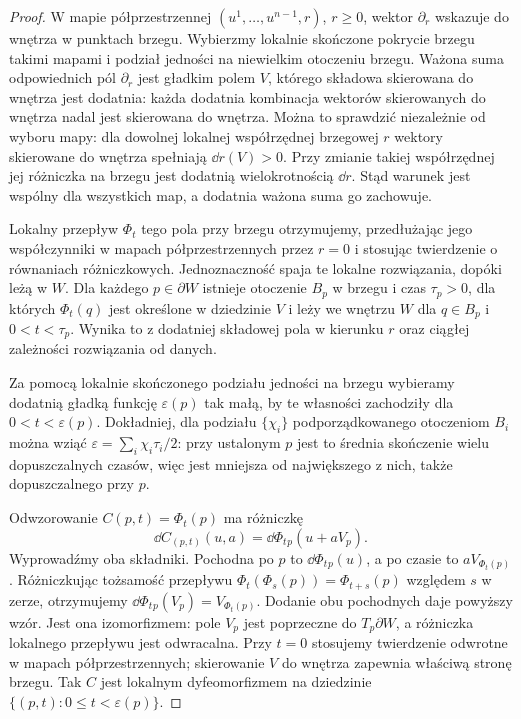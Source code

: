 \begin{proof}
W mapie półprzestrzennej
$(u^1,\ldots,u^{n-1},r)$, $r\geq0$,
wektor $\partial_r$ wskazuje do
wnętrza w punktach brzegu. Wybierzmy
lokalnie skończone pokrycie brzegu
takimi mapami i podział jedności
na niewielkim otoczeniu brzegu.
Ważona suma odpowiednich pól
$\partial_r$ jest gładkim polem
$V$, którego składowa skierowana
do wnętrza jest dodatnia:
każda dodatnia kombinacja
wektorów skierowanych do wnętrza
nadal jest skierowana do wnętrza.
Można to sprawdzić niezależnie od wyboru mapy:
dla dowolnej lokalnej współrzędnej brzegowej $r$
wektory skierowane do wnętrza spełniają $\dd r(V)>0$.
Przy zmianie takiej współrzędnej jej różniczka na brzegu
jest dodatnią wielokrotnością $\dd r$.
Stąd warunek jest wspólny dla wszystkich map,
a dodatnia ważona suma go zachowuje.

Lokalny przepływ $\Phi_t$ tego pola przy brzegu
otrzymujemy, przedłużając jego współczynniki
w mapach półprzestrzennych przez $r=0$ i stosując
twierdzenie o równaniach różniczkowych. Jednoznaczność
spaja te lokalne rozwiązania, dopóki leżą w $W$.
Dla każdego $p\in\partial W$ istnieje otoczenie
$B_p$ w brzegu i czas $\tau_p>0$, dla których
$\Phi_t(q)$ jest określone w dziedzinie $V$
i leży we wnętrzu $W$ dla $q\in B_p$ i $0<t<\tau_p$.
Wynika to z dodatniej składowej pola w kierunku $r$
oraz ciągłej zależności rozwiązania od danych.

Za pomocą lokalnie skończonego podziału jedności
na brzegu wybieramy dodatnią gładką funkcję
$\varepsilon(p)$ tak małą, by te własności zachodziły
dla $0<t<\varepsilon(p)$. Dokładniej, dla podziału
$\{\chi_i\}$ podporządkowanego otoczeniom $B_i$
można wziąć $\varepsilon=\sum_i\chi_i\tau_i/2$:
przy ustalonym $p$ jest to średnia skończenie wielu
dopuszczalnych czasów, więc jest mniejsza od
największego z nich, także dopuszczalnego przy $p$.

Odwzorowanie $C(p,t)=\Phi_t(p)$ ma różniczkę
\[
 \dd C_{(p,t)}(u,a)=\dd\Phi_t{}_p(u+aV_p).
\]
Wyprowadźmy oba składniki.
Pochodna po $p$ to $\dd\Phi_t{}_p(u)$,
a po czasie to $aV_{\Phi_t(p)}$.
Różniczkując tożsamość przepływu
$\Phi_t(\Phi_s(p))=\Phi_{t+s}(p)$ względem $s$ w zerze,
otrzymujemy $\dd\Phi_t{}_p(V_p)=V_{\Phi_t(p)}$.
Dodanie obu pochodnych daje powyższy wzór.
Jest ona izomorfizmem: pole $V_p$ jest poprzeczne
do $T_p\partial W$, a różniczka lokalnego przepływu
jest odwracalna. Przy $t=0$ stosujemy twierdzenie
odwrotne w mapach półprzestrzennych; skierowanie
$V$ do wnętrza zapewnia właściwą stronę brzegu.
Tak $C$ jest lokalnym dyfeomorfizmem na dziedzinie
$\{(p,t):0\leq t<\varepsilon(p)\}$.


\end{proof}
